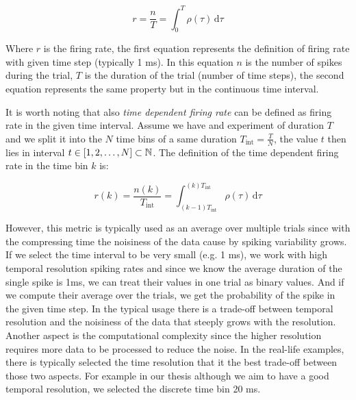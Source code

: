 \begin{equation}
    r = \frac{n}{T} = \int_{0}^{T} \rho(\tau) \,\mathrm{d}\tau    
\end{equation}
\label{eq:firing_rate}

Where $r$ is the firing rate, the first equation represents the definition of 
firing rate with given time step (typically 1 ms). In this equation $n$ is the 
number of spikes during the trial, $T$ is the duration of the trial (number of 
time steps), the second equation represents the same property but in the continuous
time interval. 

It is worth noting that also \emph{time dependent firing rate} can be defined as firing rate in the given time interval. Assume we have and experiment of duration $T$ and we split it into the $N$ time bins of a same duration $T_{\text{int}} = \frac{T}{N}$, the value $t$ then lies in interval $t \in [1, 2, \dots, N] \subset \mathbb{N}$. The definition of the time dependent firing rate in the time bin $k$ is:

\begin{equation}
    r(k) = \frac{n(k)}{T_{\text{int}}} = \int_{(k-1)T_{\text{int}}}^{(k)T_{\text{int}}} \rho(\tau) \,\mathrm{d}\tau  
\end{equation}
\label{eq:firing_rate_time}


However, this metric is typically used as an average over multiple trials since with the compressing
time the noisiness of the data cause by spiking variability grows. If we 
select the time interval to be very small (e.g. 1 ms), we work with high temporal 
resolution spiking rates and since we know the average duration of the single spike is 1ms, we 
can treat their values in one trial as binary values. And if we compute their average
over the trials, we get the probability of the spike in the given time step. In the 
typical usage there is a trade-off between temporal resolution and the noisiness of the
data that steeply grows with the resolution. Another aspect is the computational 
complexity since the higher resolution requires more data to be processed to reduce 
the noise. In the real-life examples, there is typically selected the time 
resolution that it the best trade-off between those two aspects. For example in our
thesis although we aim to have a good temporal resolution, we selected the discrete 
time bin 20 ms.

